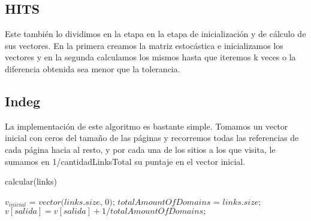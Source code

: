 \subsection{HITS}
Este también lo dividimos en la etapa en la etapa de inicialización y de cálculo de sus vectores. En la primera creamos la matriz estocástica e inicializamos los vectores y en la segunda calculamos los mismos hasta que iteremos k veces o la diferencia obtenida sea menor que la tolerancia.

%	
	

\subsection{Indeg}

La implementación de este algoritmo es bastante simple. Tomamos un vector inicial con ceros del tamaño de las páginas y recorremos todas las referencias de cada página hacia al resto, y por cada una de los sitios a los que visita, le sumamos en 1/cantidadLinksTotal su puntaje en el vector inicial.

\begin{algorithm}
\caption{calcular(links)}\label{euclid}
\begin{algorithmic}[1]
\State $\textit{$v_{inicial}$ = vector(links.size, 0);}$ 
\State $\textit{$totalAmountOfDomains$ = links.size;}$ 
			\State $\textit{$v[salida] = v[salida] + 1/totalAmountOfDomains;$}$ 
		\EndFor
	\EndIf
\EndFor
\end{algorithmic}
\end{algorithm}